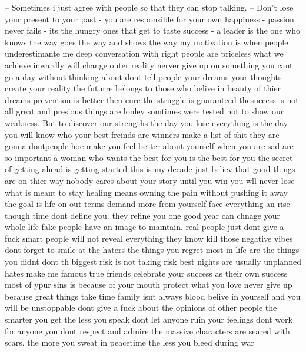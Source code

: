 -- Sometimes i just agree with people so that they can stop talking.
-- Don't lose your present to your past
- you are responsible for your own happiness
- passion never fails 
- its the hungry ones that get to taste success
- a leader is the one who knows the way goes the way and shows the way
my motivation is when people underestimante me
deep conversation with right people are priceless
what we achieve inwardly will change outer reality 
nerver give up on something  you cant go a day without thinking about
dont tell people your dreams
your thoughts create your reality 
the futurre belongs to those who belive in beauty of thier dreams
prevention is better then cure
the struggle is guaranteed thesuccess is not 
all great and presious things are lonley
somtimes were tested not to show our weakness. But to discover our strengths
the day you lose everything is the day you will know who your best freinds are 
winners make a list of shit they are gonna dontpeople hoe make you feel better about yourself when you are sad are so important 
a woman who wants the best for you is the best for you 
the secret of getting ahead is getting started
this is my decade
just believ that good things are on thier way
nobody cares about your story until you win 
you wll never lose what is meant to stay
healing means owning the pain without pushing it away
the goal is life on out terms 
demand more from yourself
face everything an rise 
though time dont define you. they refine you 
one good year can chnage your whole life
fake people have an image to maintain. real people just dont give a fuck
smart people will not reveal everything they know
kill those negative vibes 
dont forget to smile at the haters 
the things you regret most in life are the things you didnt dont
th biggest risk is not taking risk 
best nights are usually unplanned
hates make me famous
true friends celebrate your success as their own success 
most of ypur sins is because of your mouth
protect what you love
never give up because great things take time 
family isnt always blood 
belive in yourself and you will be unstoppable
dont give a fuck about the opinions of other people
the smarter you get the less you speak 
dont let anyone ruin your feelings
dont work for anyone you dont respect and admire
the massive characters are seared with scars.
the more you sweat in peacetime the less you bleed during war

